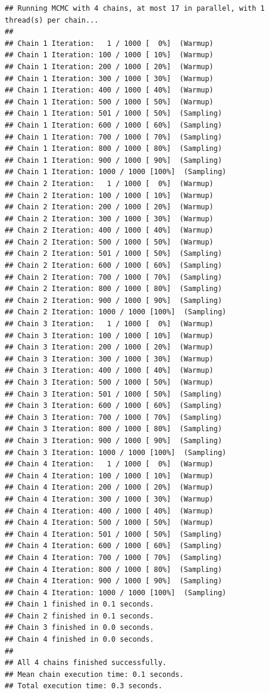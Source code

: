 \documentclass[
]{book}
\begin{document}
\begin{verbatim}
## Running MCMC with 4 chains, at most 17 in parallel, with 1 thread(s) per chain...
## 
## Chain 1 Iteration:   1 / 1000 [  0%]  (Warmup) 
## Chain 1 Iteration: 100 / 1000 [ 10%]  (Warmup) 
## Chain 1 Iteration: 200 / 1000 [ 20%]  (Warmup) 
## Chain 1 Iteration: 300 / 1000 [ 30%]  (Warmup) 
## Chain 1 Iteration: 400 / 1000 [ 40%]  (Warmup) 
## Chain 1 Iteration: 500 / 1000 [ 50%]  (Warmup) 
## Chain 1 Iteration: 501 / 1000 [ 50%]  (Sampling) 
## Chain 1 Iteration: 600 / 1000 [ 60%]  (Sampling) 
## Chain 1 Iteration: 700 / 1000 [ 70%]  (Sampling) 
## Chain 1 Iteration: 800 / 1000 [ 80%]  (Sampling) 
## Chain 1 Iteration: 900 / 1000 [ 90%]  (Sampling) 
## Chain 1 Iteration: 1000 / 1000 [100%]  (Sampling) 
## Chain 2 Iteration:   1 / 1000 [  0%]  (Warmup) 
## Chain 2 Iteration: 100 / 1000 [ 10%]  (Warmup) 
## Chain 2 Iteration: 200 / 1000 [ 20%]  (Warmup) 
## Chain 2 Iteration: 300 / 1000 [ 30%]  (Warmup) 
## Chain 2 Iteration: 400 / 1000 [ 40%]  (Warmup) 
## Chain 2 Iteration: 500 / 1000 [ 50%]  (Warmup) 
## Chain 2 Iteration: 501 / 1000 [ 50%]  (Sampling) 
## Chain 2 Iteration: 600 / 1000 [ 60%]  (Sampling) 
## Chain 2 Iteration: 700 / 1000 [ 70%]  (Sampling) 
## Chain 2 Iteration: 800 / 1000 [ 80%]  (Sampling) 
## Chain 2 Iteration: 900 / 1000 [ 90%]  (Sampling) 
## Chain 2 Iteration: 1000 / 1000 [100%]  (Sampling) 
## Chain 3 Iteration:   1 / 1000 [  0%]  (Warmup) 
## Chain 3 Iteration: 100 / 1000 [ 10%]  (Warmup) 
## Chain 3 Iteration: 200 / 1000 [ 20%]  (Warmup) 
## Chain 3 Iteration: 300 / 1000 [ 30%]  (Warmup) 
## Chain 3 Iteration: 400 / 1000 [ 40%]  (Warmup) 
## Chain 3 Iteration: 500 / 1000 [ 50%]  (Warmup) 
## Chain 3 Iteration: 501 / 1000 [ 50%]  (Sampling) 
## Chain 3 Iteration: 600 / 1000 [ 60%]  (Sampling) 
## Chain 3 Iteration: 700 / 1000 [ 70%]  (Sampling) 
## Chain 3 Iteration: 800 / 1000 [ 80%]  (Sampling) 
## Chain 3 Iteration: 900 / 1000 [ 90%]  (Sampling) 
## Chain 3 Iteration: 1000 / 1000 [100%]  (Sampling) 
## Chain 4 Iteration:   1 / 1000 [  0%]  (Warmup) 
## Chain 4 Iteration: 100 / 1000 [ 10%]  (Warmup) 
## Chain 4 Iteration: 200 / 1000 [ 20%]  (Warmup) 
## Chain 4 Iteration: 300 / 1000 [ 30%]  (Warmup) 
## Chain 4 Iteration: 400 / 1000 [ 40%]  (Warmup) 
## Chain 4 Iteration: 500 / 1000 [ 50%]  (Warmup) 
## Chain 4 Iteration: 501 / 1000 [ 50%]  (Sampling) 
## Chain 4 Iteration: 600 / 1000 [ 60%]  (Sampling) 
## Chain 4 Iteration: 700 / 1000 [ 70%]  (Sampling) 
## Chain 4 Iteration: 800 / 1000 [ 80%]  (Sampling) 
## Chain 4 Iteration: 900 / 1000 [ 90%]  (Sampling) 
## Chain 4 Iteration: 1000 / 1000 [100%]  (Sampling) 
## Chain 1 finished in 0.1 seconds.
## Chain 2 finished in 0.1 seconds.
## Chain 3 finished in 0.0 seconds.
## Chain 4 finished in 0.0 seconds.
## 
## All 4 chains finished successfully.
## Mean chain execution time: 0.1 seconds.
## Total execution time: 0.3 seconds.
\end{verbatim}
\end{document}
